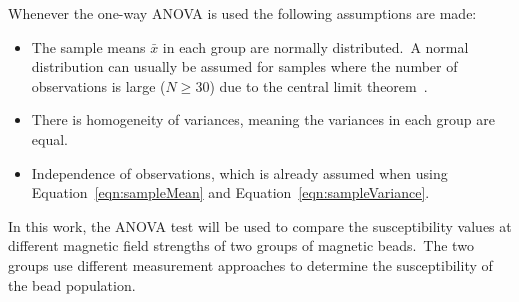 Whenever the one-way ANOVA is used the following assumptions are made:\
\begin{itemize}
	\item The sample means $\bar{x}$ in each group are normally distributed.\ A normal distribution can usually be assumed for samples where the number of observations is large ($N\geq 30$) due to the central limit theorem~\cite{Kreyszig2006,Israel1992}.\
	\item There is homogeneity of variances, meaning the variances in each group are equal.\
	\item Independence of observations, which is already assumed when using Equation~\ref{eqn:sampleMean} and Equation~\ref{eqn:sampleVariance}.\
\end{itemize}
In this work, the ANOVA test will be used to compare the susceptibility values at different magnetic field strengths of two groups of magnetic beads.\ The two groups use different measurement approaches to determine the susceptibility of the bead population.\